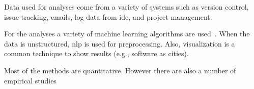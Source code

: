 Data used for analyses come from a variety of systems such as version control, issue tracking, emails, log data from \gls{ide}, and project management.



For the analyses a variety of machine learning algorithms are used~\citep{bibid}. When the data is unstructured, \gls{nlp} is used for preprocessing. Also, visualization is a common technique to show results \citep{Lanzaetal} (e.g., software as cities).

Most of the methods are quantitative. However there are also a number of empirical studies \citep{DBLP:journals/ese/KalliamvakouGBS16,dehghan2017predicting} 


%
%


%
%
%


